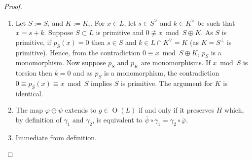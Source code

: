 \documentclass[12pt, a4paper]{article}
\newcommand{\opn}{\operatorname}
\newcommand{\op}{\oplus}
\begin{document}
\begin{proof}
  \begin{enumerate}
  \item
    Let $S:=S_i$ and $K:=K_i$. 
    For $x \in L$, let $s \in S^{\vee}$ and $k \in K^{\vee}$ be such that $x = s + k$.
Suppose $S \subset L$ is primitive and $0 \not \equiv x \bmod{S \op K}$.
    As $S$ is primitive, if $p_S(x) = 0$ then $s \in S$ and $k \in L \cap K^{\vee} = K$ (as $K=S^{\perp}$ is primitive).
    Hence, from the contradiction $0 \equiv x \bmod{S \op K}$, $p_S$ is a monomorphism.
Now suppose $p_S$ and $p_K$ are monomorphisms.
    If $x \bmod{ S}$ is torsion then $k=0$ and as  $p_S$ is a monomorphism, the contradiction $0 \equiv p_S(x) \equiv x \bmod{S}$ implies $S$ is primitive.
    The argument for $K$ is identical.
  \item  The map $\varphi \op \psi$ extends to $g \in \opn{O}(L)$ if and only if it preserves $H$ which,  by definition of $\gamma_1$ and $\gamma_2$, is equivalent to $\overline{\psi} \circ \gamma_1 = \gamma_2 \circ \overline{\varphi}$.
  \item Immediate from definition.
  \end{enumerate}
\end{proof}
\end{document}
